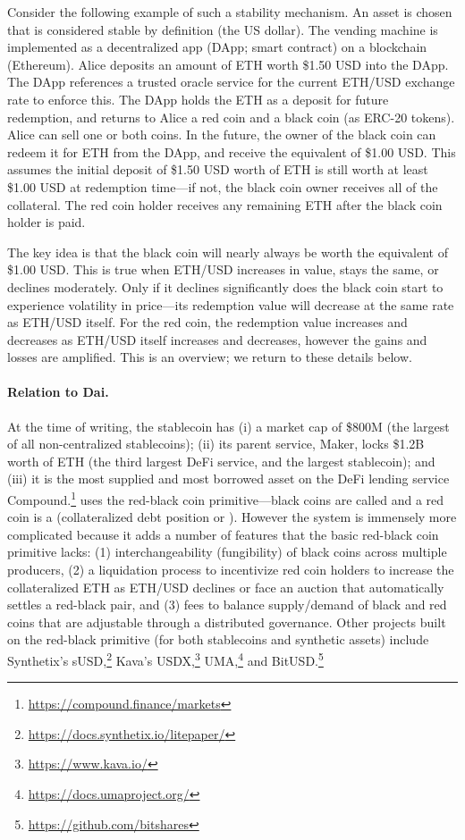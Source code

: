 Consider the following example of such a stability mechanism. An asset is chosen that is considered stable by definition (\eg the US dollar). The vending machine is implemented as a decentralized app (DApp; \aka smart contract) on a blockchain (\eg Ethereum). Alice deposits an amount of ETH worth \$1.50 USD into the DApp. The DApp references a trusted oracle service for the current ETH/USD exchange rate to enforce this. The DApp holds the ETH as a deposit for future redemption, and returns to Alice a red coin and a black coin (\eg as ERC-20 tokens). Alice can sell one or both coins. In the future, the owner of the black coin can redeem it for ETH from the DApp, and receive the equivalent of \$1.00 USD. This assumes the initial deposit of \$1.50 USD worth of ETH is still worth at least \$1.00 USD at redemption time---if not, the black coin owner receives all of the collateral. The red coin holder receives any remaining ETH after the black coin holder is paid.

The key idea is that the black coin will nearly always be worth the equivalent of \$1.00 USD. This is true when ETH/USD increases in value, stays the same, or declines moderately. Only if it declines significantly does the black coin start to experience volatility in price---its redemption value will decrease at the same rate as ETH/USD itself. For the red coin, the redemption value increases and decreases as ETH/USD itself increases and decreases, however the gains and losses are amplified. This is an overview; we return to these details below.

\paragraph{Relation to Dai.} At the time of writing, the stablecoin \dai has (i) a market cap of \$800M (the largest of all non-centralized stablecoins); (ii) its parent service, Maker, locks \$1.2B worth of ETH (the third largest DeFi service, and the largest stablecoin); and (iii) it is the most supplied and most borrowed asset on the DeFi lending service Compound.\footnote{\url{https://compound.finance/markets}} \dai uses the red-black coin primitive---black coins are called \dai and a red coin is a \vault (\nee collateralized debt position or \cdp). However the system is immensely more complicated because it adds a number of features that the basic red-black coin primitive lacks: (1) interchangeability (fungibility) of black coins across multiple producers, (2) a liquidation process to incentivize red coin holders to increase the collateralized ETH as ETH/USD declines or face an auction that automatically settles a red-black pair, and (3) fees to balance supply/demand of black and red coins that are adjustable through a distributed governance. Other projects built on the red-black primitive (for both stablecoins and synthetic assets) include Synthetix's sUSD,\footnote{\url{https://docs.synthetix.io/litepaper/}} Kava's USDX,\footnote{\url{https://www.kava.io/}} UMA,\footnote{\url{https://docs.umaproject.org/}} and BitUSD.\footnote{\url{https://github.com/bitshares}}


